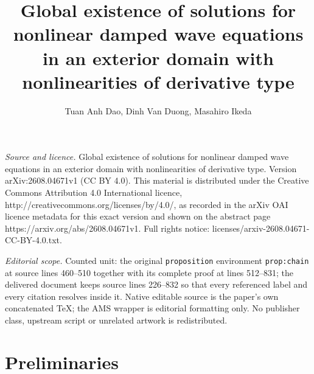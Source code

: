 \documentclass[10pt,a4paper]{amsart}
\numberwithin{equation}{section}
\begin{document}
\title[Global existence of solutions for nonlinear damped wave equa]{Global existence of solutions for nonlinear damped wave equations in an exterior domain with nonlinearities of derivative type}
\author{Tuan Anh Dao, Dinh Van Duong, Masahiro Ikeda}
\date{}
\maketitle
\noindent\emph{Source and licence.} Global existence of solutions for nonlinear damped wave equations in an exterior domain with nonlinearities of derivative type. Version arXiv:2608.04671v1 (CC BY 4.0). This material is distributed under the Creative Commons Attribution 4.0 International licence, http://creativecommons.org/licenses/by/4.0/, as recorded in the arXiv OAI licence metadata for this exact version and shown on the abstract page https://arxiv.org/abs/2608.04671v1. Full rights notice: licenses/arxiv-2608.04671-CC-BY-4.0.txt.\par\smallskip
\noindent\textit{Editorial scope.} Counted unit: the original \texttt{proposition} environment \texttt{prop:chain} at source lines 460--510 together with its complete proof at lines 512--831; the delivered document keeps source lines 226--832 so that every referenced label and every citation resolves inside it. Native editable source is the paper's own concatenated TeX; the AMS wrapper is editorial formatting only. No publisher class, upstream script or unrelated artwork is redistributed.
\section{Preliminaries}\label{Pre.Sec}
\end{document}
